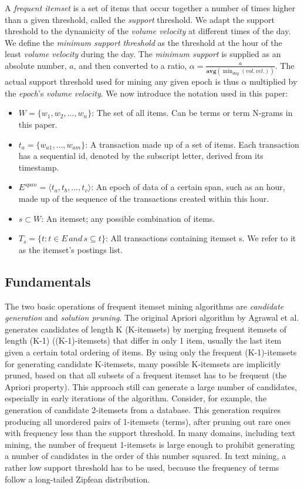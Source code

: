 \documentclass{sig-alternate}
\begin{document}
A \emph{frequent itemset} is a set of items that occur together a number of
times higher than a given threshold, called the \emph{support} threshold.
We adapt the support threshold to the dynamicity of the \emph{volume velocity} at
different times of the day.
We define the \emph{minimum support threshold} as the threshold at the hour
of the least \emph{volume velocity} during the day.
The \emph{minimum support} is supplied as an absolute number, $a$, and then
converted to a ratio, $\alpha = \frac{a}{\textbf{avg}(\min_{day}{(vol.\, vel.)})}$.
The actual support threshold used for mining any given epoch is thus
$\alpha$ multiplied by the \emph{epoch}'s \emph{volume velocity}. 
We now introduce the notation used in this paper:
\begin{itemize}
\item $W = \{w_1,w_2,\ldots, w_n\}$: The set of all items. Can be terms or term N-grams in this paper.
\item $t_a = \{w_{a1},\ldots, w_{am}\}$: A transaction made up of a set of items. Each transaction has a sequential id, denoted by the subscript letter, derived from its timestamp.
\item $E^{span} = \langle t_a, t_b, \ldots, t_v\rangle$: An epoch of data of a certain span, such as an hour, made up of the sequence of the transactions created within this hour.
\item $s \subset W$: An itemset; any possible combination of items. 
\item $T_s = \{t: t \in E \, and \, s \subseteq t\}$: All transactions containing itemset s. We refer to it as the itemset's postings list.
\end{itemize}

\subsection{Fundamentals}

The two basic operations of frequent itemset mining algorithms are
\emph{candidate generation} and \emph{solution pruning}.
The original Apriori algorithm by Agrawal et al. \cite{agrawal1994fast}
generates candidates of length K (K-itemsets) by merging frequent itemsets of
length (K-1) ((K-1)-itemsets) that differ in only 1 item, usually the last
item given a certain total ordering of items.
By using only the frequent  (K-1)-itemsets for generating candidate K-itemsets,
many possible K-itemsets are implicitly pruned, based on that all subsets of a
frequent itemset has to be frequent (the Apriori property).
This approach still can generate a large number of candidates, especially
in early iterations of the algorithm.
Consider, for example, the generation of candidate 2-itemsets from a database.
This generation requires producing all unordered pairs of 1-itemsets (terms),
after pruning out rare ones with frequency less than the support threshold.
In many domains, including text mining, the number of frequent 1-itemsets is
large enough to prohibit generating a number of candidates in the order of this
number squared.
In text mining, a rather low support threshold has to be used, because the
frequency of terms follow a long-tailed Zipfean distribution.
\end{document}
